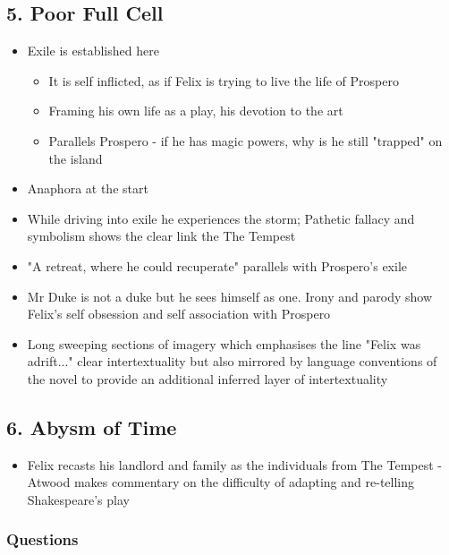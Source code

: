 	\subsection{5. Poor Full Cell}
	
		\begin{itemize}
			\item Exile is established here
				\begin{itemize}
					\item It is self inflicted, as if Felix is trying to live the life of Prospero
					\item Framing his own life as a play, his devotion to the art
					\item Parallels Prospero - if he has magic powers, why is he still "trapped" on the island
				\end{itemize}
			\item Anaphora at the start
			\item While driving into exile he experiences the storm; Pathetic fallacy and symbolism shows the clear link the The Tempest
			\item "A retreat, where he could recuperate" parallels with Prospero's exile
			\item Mr Duke is not a duke but he sees himself as one. Irony and parody show Felix's self obsession and self association with Prospero
			\item Long sweeping sections of imagery which emphasises the line "Felix was adrift..." clear intertextuality but also mirrored by language conventions of the novel to provide an additional inferred layer of intertextuality
		\end{itemize}
	
	\subsection{6. Abysm of Time}
	
		\begin{itemize}
			\item Felix recasts his landlord and family as the individuals from The Tempest - Atwood makes commentary on the difficulty of adapting and re-telling Shakespeare's play
		\end{itemize}

		\subsubsection{Questions}
		
